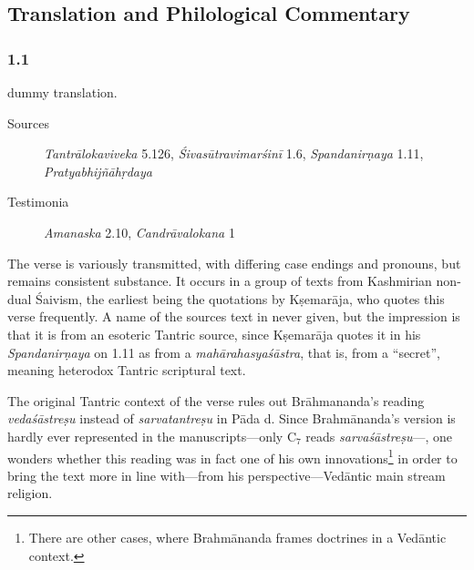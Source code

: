 \pagestyle{HPed} %
\begin{ekdosis}

  \chapter{Translation and Philological Commentary}

  \subsection*{1.1}
  \begin{translation}[hp01_001]
    dummy translation.
  \end{translation}

  \begin{sources}[hp01_001]
    \begin{description}
    \item[Sources]{\emph{Tantrālokaviveka} 5.126, \emph{Śivasūtravimarśinī} 1.6, \emph{Spandanirṇaya} 1.11, \emph{Pratyabhijñāhṛdaya}}
    \item[Testimonia]{\emph{Amanaska} 2.10, \emph{Candrāvalokana} 1}
    \end{description}
  \end{sources}
  
  \begin{philcomm}[hp01_001]
    \noindent
    The verse is variously transmitted, with differing case endings and pronouns, but remains
    consistent substance. It occurs in a group of texts from Kashmirian non-dual Śaivism, the earliest
    being the quotations by Kṣemarāja, who quotes this verse frequently. A name of the sources text in
    never given, but the impression is that it is from an esoteric Tantric source, since Kṣemarāja
    quotes it in his \emph{Spandanirṇaya} on 1.11 as from a \emph{mahārahasyaśāstra}, that is, from a
    ``secret'', meaning heterodox Tantric scriptural text.

    The original Tantric context of the verse rules out Brāhmananda's reading \emph{vedaśāstreṣu}
    instead of \emph{sarvatantreṣu} in Pāda d. Since Brahmānanda's version is hardly ever represented
    in the manuscripts—only C$_{7}$ reads \emph{sarvaśāstreṣu}—, one wonders whether this reading was
    in fact one of his own innovations\footnote{There are other cases, where Brahmānanda frames
      doctrines in a Vedāntic context.}  in order to bring the text more in line with—from his
    perspective—Vedāntic main stream religion.


\end{philcomm}
\end{ekdosis}
